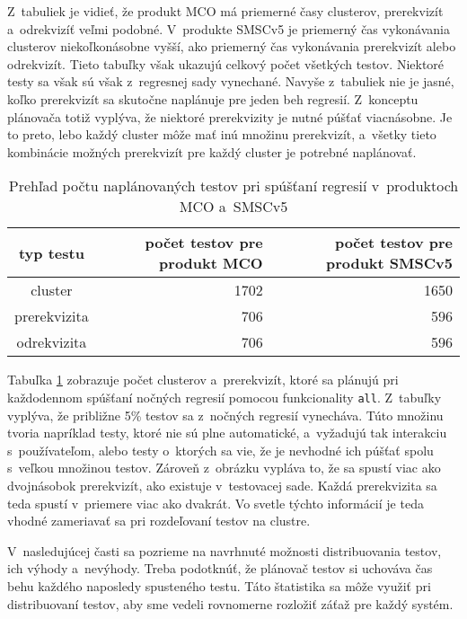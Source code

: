 Z~tabuliek je vidieť, že produkt MCO má priemerné časy clusterov, prerekvizít a~odrekvizíť veľmi podobné.
V~produkte SMSCv5 je priemerný čas vykonávania clusterov niekoľkonásobne vyšší, ako priemerný čas vykonávania prerekvizít alebo odrekvizít.
Tieto tabuľky však ukazujú celkový počet všetkých testov. Niektoré testy sa však sú však z~regresnej sady vynechané.
Navyše z~tabuliek nie je jasné, koľko prerekvizít sa skutočne naplánuje pre jeden beh regresií.
Z~konceptu plánovača totiž vyplýva, že niektoré prerekvizity je nutné púšťať viacnásobne.
Je to preto, lebo každý cluster môže mať inú množinu prerekvizít, a~všetky tieto kombinácie možných prerekvizít pre každý cluster
je potrebné naplánovať.

\begin{table}
  \begin{center}
    \begin{tabular}{| c | r | r |}
    \hline
    typ testu  & počet testov pre produkt MCO & počet testov pre produkt SMSCv5 \\ \hline
    cluster      & 1702 & 1650 \\ \hline
    prerekvizita & 706  & 596  \\ \hline
    odrekvizita  & 706  & 596 \\
    \hline
    \end{tabular}
    \label{tabulka:pocet_naplanovanych_testov}
    \caption{Prehľad počtu naplánovaných testov pri spúšťaní regresií v~produktoch MCO a~SMSCv5}
  \end{center}
\end{table}

Tabuľka \ref{tabulka:pocet_naplanovanych_testov} zobrazuje počet clusterov a~prerekvizít, ktoré sa plánujú
pri každodennom spúšťaní nočných regresií pomocou funkcionality \texttt{all}. Z~tabuľky vyplýva, že približne 5\% testov sa 
z~nočných regresií vynecháva. Túto množinu tvoria napríklad testy, ktoré nie sú plne automatické, a~vyžadujú tak interakciu s~používateľom,
alebo testy o~ktorých sa vie, že je nevhodné ich púšťať spolu s~veľkou množinou testov.
Zároveň z~obrázku vypláva to, že sa spustí viac ako dvojnásobok prerekvizít, ako existuje v~testovacej sade.
Každá prerekvizita sa teda spustí v~priemere viac ako dvakrát. 
Vo svetle týchto informácií je teda vhodné zameriavať sa pri rozdeľovaní testov na clustre.

V~nasledujúcej časti sa pozrieme na navrhnuté možnosti distribuovania testov, ich výhody a~nevýhody.
Treba podotknúť, že plánovač testov si uchováva čas behu každého naposledy spusteného testu.
Táto štatistika sa môže využiť pri distribuovaní testov, aby sme vedeli rovnomerne rozložiť záťaž pre každý systém.
